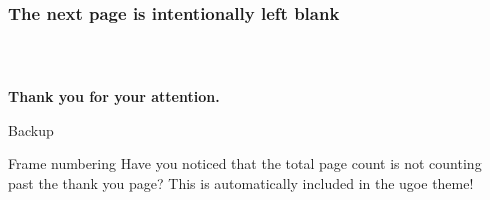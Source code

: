\documentclass[10pt]{beamer}
\begin{document}
\begin{frame}
  \frametitle{The next page is intentionally left blank}
\end{frame}

\begin{frame}
  \frametitle{~}
\end{frame}

\appendix
\begin{frame}[plain]
  \ugoeAddLogo
  \begin{center}
    \textbf{\Large Thank you for your attention.}
  \end{center}
\end{frame}

\begin{frame}
  \ugoeAddLogo
  \begin{center}
    \Huge Backup
  \end{center}
\end{frame}

\begin{frame}
  \begin{alertblock}{Frame numbering}
    Have you noticed that the total page count is not counting past the thank 
    you page? This is automatically included in the ugoe theme!
  \end{alertblock}
\end{frame}
\end{document}
